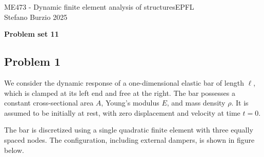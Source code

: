 \documentclass[12pt]{article}
\begin{document}
\noindent ME473 - Dynamic finite element analysis of structures\hfill EPFL\\
Stefano Burzio \hfill 2025\\
\vspace{0.3cm}

\hspace*{\fill}\textbf{\Large Problem set 11}\hspace*{\fill}

\hrulefill

\subsection*{Problem 1}
We consider the dynamic response of a one-dimensional elastic bar of length \( \ell \), which is clamped at its left end and free at the right. The bar possesses a constant cross-sectional area \( A \), Young’s modulus \( E \), and mass density \( \rho \). It is assumed to be initially at rest, with zero displacement and velocity at time \( t = 0 \).

The bar is discretized using a single quadratic finite element with three equally spaced nodes. The configuration, including external dampers, is shown in figure below.
\begin{figure}[h!]
  \centering
  \label{fig:bar}
\end{figure}
\end{document}
